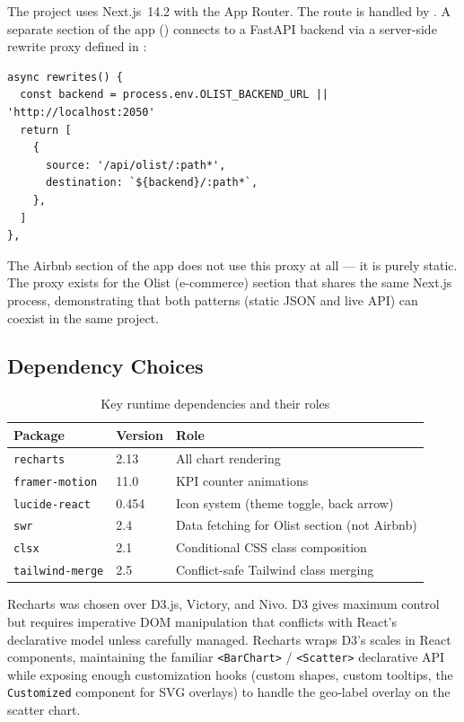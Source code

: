 The project uses Next.js~14.2 with the App Router. The route 
is handled by . A separate section of the app
() connects to a FastAPI backend via a server-side rewrite proxy
defined in :

\begin{lstlisting}[style=typescript, caption={Rewrite proxy for the Olist backend in \filepath{next.config.js}}]
async rewrites() {
  const backend = process.env.OLIST_BACKEND_URL || 'http://localhost:2050'
  return [
    {
      source: '/api/olist/:path*',
      destination: `${backend}/:path*`,
    },
  ]
},
\end{lstlisting}

The Airbnb section of the app does not use this proxy at all — it is purely static.
The proxy exists for the Olist (e-commerce) section that shares the same Next.js
process, demonstrating that both patterns (static JSON and live API) can coexist
in the same project.

\subsection{Dependency Choices}

\begin{table}[h]
  \centering
  \caption{Key runtime dependencies and their roles}
  \label{tab:airbnb-deps}
  \begin{tabular}{lll}
    \toprule
    \textbf{Package}      & \textbf{Version} & \textbf{Role} \\
    \midrule
    \texttt{recharts}     & 2.13             & All chart rendering \\
    \texttt{framer-motion} & 11.0            & KPI counter animations \\
    \texttt{lucide-react} & 0.454            & Icon system (theme toggle, back arrow) \\
    \texttt{swr}          & 2.4              & Data fetching for Olist section (not Airbnb) \\
    \texttt{clsx}         & 2.1              & Conditional CSS class composition \\
    \texttt{tailwind-merge} & 2.5            & Conflict-safe Tailwind class merging \\
    \bottomrule
  \end{tabular}
\end{table}

Recharts was chosen over D3.js, Victory, and Nivo. D3 gives maximum control but
requires imperative DOM manipulation that conflicts with React's declarative model
unless carefully managed. Recharts wraps D3's scales in React components, maintaining
the familiar \texttt{<BarChart>} / \texttt{<Scatter>} declarative API while
exposing enough customization hooks (custom shapes, custom tooltips, the
\texttt{Customized} component for SVG overlays) to handle the geo-label overlay
on the scatter chart.

